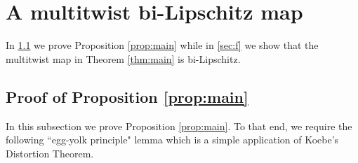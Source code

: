 \documentclass{amsart}
\DeclareMathOperator{\dist}{dist}
\begin{document}
%




\section{A multitwist bi-Lipschitz map}\label{sec:multitwist}

In \textsection\ref{sec:proofprop} we prove Proposition \ref{prop:main} while in \textsection\ref{sec:f} we show that the multitwist map in Theorem \ref{thm:main} is bi-Lipschitz.

\subsection{Proof of Proposition \ref{prop:main}}\label{sec:proofprop}

In this subsection we prove Proposition \ref{prop:main}. To that end, we require the following ``egg-yolk principle" lemma which is a simple application of Koebe's Distortion Theorem. 
\end{document}
